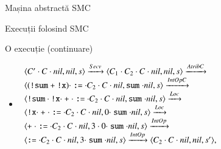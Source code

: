 \documentclass[handout,xcolor=pdftex,romanian,colorlinks]{beamer}
\begin{document}
\begin{section}{Mașina abstractă SMC}
\begin{subsection}{Execuții folosind SMC}
\begin{frame}[fragile]{O execuție (continuare)}{}
\begin{itemize}
\item[] $\begin{array}{l}
\c{C'\cdot C\cdot \Snil, \Snil, s} 
\xrightarrow{Secv} \c{C_1 \cdot C_2 \cdot C\cdot \Snil, \Snil, s}  
\xrightarrow{AtribC} 
\\
\c{({\terminal{!} \terminal{sum}} \terminal{+} {\terminal{!} \terminal{x}}) \cdot \terminal{:=} \cdot C_2 \cdot C\cdot \Snil, \terminal{sum}\cdot\Snil, s} 
\xrightarrow{IntOpC}
\\ 
\c{{\terminal{!} \terminal{sum}} \cdot {\terminal{!} \terminal{x}} \cdot \terminal{+} \cdot \terminal{:=} \cdot C_2 \cdot C\cdot \Snil, \terminal{sum}\cdot\Snil, s}
\xrightarrow{Loc}
\\
\c{{\terminal{!} \terminal{x}} \cdot \terminal{+} \cdot \terminal{:=} \cdot C_2 \cdot C\cdot \Snil, 0 \cdot \terminal{sum}\cdot\Snil, s} 
\xrightarrow{Loc}
\\
\c{\terminal{+} \cdot \terminal{:=} \cdot C_2 \cdot C\cdot \Snil, 3 \cdot 0 \cdot \terminal{sum}\cdot\Snil, s} 
\xrightarrow{IntOp}
\\
\c{\terminal{:=} \cdot C_2 \cdot C\cdot \Snil, 3 \cdot \terminal{sum}\cdot\Snil, s} 
\xrightarrow{IntOp} \c{C_2 \cdot C\cdot \Snil, \Snil, s'},
\end{array}$


\end{itemize}
\end{frame}
\end{subsection}
\end{section}
\end{document}
